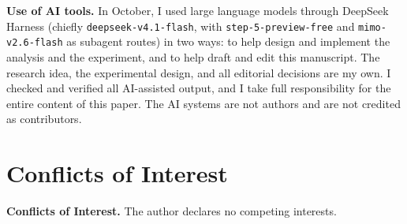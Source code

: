 \documentclass[11pt,a4paper]{article}
\begin{document}
\textbf{Use of AI tools.} In October, I used large language models through DeepSeek Harness (chiefly \texttt{deepseek-v4.1-flash}, with \texttt{step-5-preview-free} and \texttt{mimo-v2.6-flash} as subagent routes) in two ways: to help design and implement the analysis and the experiment, and to help draft and edit this manuscript. The research idea, the experimental design, and all editorial decisions are my own. I checked and verified all AI-assisted output, and I take full responsibility for the entire content of this paper. The AI systems are not authors and are not credited as contributors.

\section*{Conflicts of Interest}

\textbf{Conflicts of Interest.} The author declares no competing interests.
\end{document}
